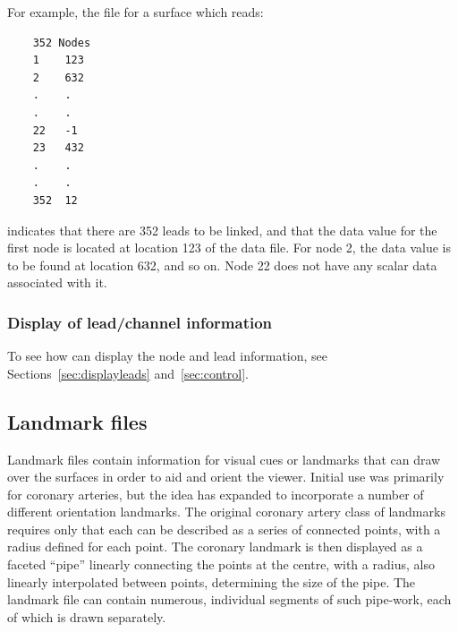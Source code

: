 \noindent
For example, the file for a surface which reads:
%
\begin{verbatim}
    352 Nodes
    1    123
    2    632
    .    .
    .    .
    22   -1
    23   432
    .    .
    .    .
    352  12
\end{verbatim}
%
indicates that there are 352 leads to be linked, and that the data value
for the first node is located at location 123 of the data file.  For node
2, the data value is to be found at location 632, and so on.  Node 22 does
not have any scalar data associated with it.

\subsubsection{Display of lead/channel information}

To see how \map{} can display the node and lead information, see
Sections~\ref{sec:displayleads} and~\ref{sec:control}. 


  \subsection{Landmark files}
  \label{sec:lmfile} 

  Landmark files contain information for visual cues or landmarks that \map{}
  can draw over the surfaces in order to aid and orient the viewer. Initial
  use was primarily for coronary arteries, but the idea has expanded to
  incorporate a number of different orientation landmarks.  The original
  coronary artery class of landmarks requires only that each can be described
  as a series of connected points, with a radius defined for each point.  The
  coronary landmark is then displayed as a faceted ``pipe'' linearly
  connecting the points at the centre, with a radius, also linearly
  interpolated between points, determining the size of the pipe.  The
  landmark file can contain numerous, individual segments of such pipe-work,
  each of which is drawn separately.

